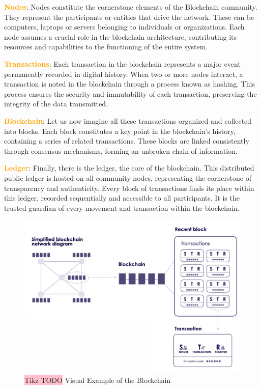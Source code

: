 \textbf{\textcolor{Orange}{Nodes}}: Nodes constitute the cornerstone elements of the Blockchain community. They represent the participants or entities that drive the network. These can be computers, laptops or servers belonging to individuals or organizations. Each node assumes a crucial role in the blockchain architecture, contributing its resources and capabilities to the functioning of the entire system.

\textbf{\textcolor{Orange}{Transactions}}: Each transaction in the blockchain represents a major event permanently recorded in digital history. When two or more nodes interact, a transaction is noted in the blockchain through a process known as hashing. This process ensures the security and immutability of each transaction, preserving the integrity of the data transmitted.

\textbf{\textcolor{Orange}{Blockchain}}: Let us now imagine all these transactions organized and collected into blocks. Each block constitutes a key point in the blockchain's history, containing a series of related transactions. These blocks are linked consistently through consensus mechanisms, forming an unbroken chain of information.

\textbf{\textcolor{Orange}{Ledger}}: Finally, there is the ledger, the core of the blockchain. This distributed public ledger is hosted on all community nodes, representing the cornerstone of transparency and authenticity. Every block of transactions finds its place within this ledger, recorded sequentially and accessible to all participants. It is the trusted guardian of every movement and transaction within the blockchain.

\begin{figure}[hb]
\centering\includegraphics[scale=0.3]{tikz/chapter2 - Blockchain.png}
\caption{{\color{red}\colorbox{pink}{Tikz TODO}} Visual Example of the Blockchain \cite{blockchainFinyear}}
\end{figure}


